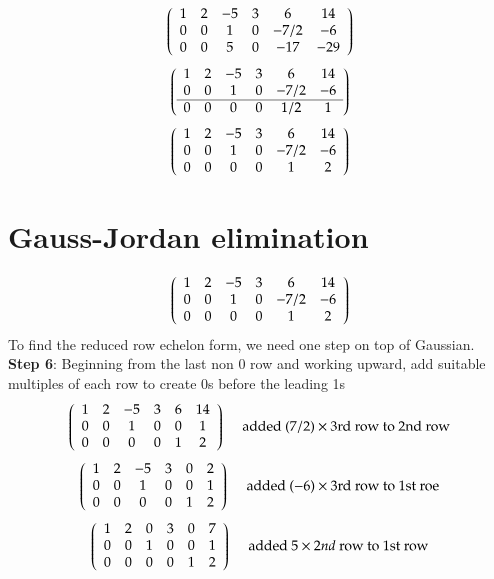 \documentclass{article}[18pt]
\begin{document}
$$\left( \begin{array} { c c c c c c } { 1 } & { 2 } & { - 5 } & { 3 } & { 6 } & { 14 } \\ { 0 } & { 0 } & { 1 } & { 0 } & { - 7 / 2 } & { - 6 } \\ { 0 } & { 0 } & { 5 } & { 0 } & { - 17 } & { - 29 } \end{array} \right)$$
$$\left( \begin{array} { c c c c c c } { 1 } & { 2 } & { - 5 } & { 3 } & { 6 } & { 14 } \\ { 0 } & { 0 } & { 1 } & { 0 } & { - 7 / 2 } & { - 6 } \\ \hline 0 & { 0 } & { 0 } & { 0 } & { 1 / 2 } & { 1 } \end{array} \right)$$
$$\left( \begin{array} { c c c c c c } { 1 } & { 2 } & { - 5 } & { 3 } & { 6 } & { 14 } \\ { 0 } & { 0 } & { 1 } & { 0 } & { - 7 / 2 } & { - 6 } \\ { 0 } & { 0 } & { 0 } & { 0 } & { 1 } & { 2 } \end{array} \right)$$
\section{Gauss-Jordan elimination}
$$\left( \begin{array} { c c c c c c } { 1 } & { 2 } & { - 5 } & { 3 } & { 6 } & { 14 } \\ { 0 } & { 0 } & { 1 } & { 0 } & { - 7 / 2 } & { - 6 } \\ { 0 } & { 0 } & { 0 } & { 0 } & { 1 } & { 2 } \end{array} \right)$$
To find the reduced row echelon form, we need one step on top of Gaussian.\\
\textbf{Step 6}: Beginning from the last non 0 row and working upward, add suitable multiples of each row to create 0s before the leading 1s
$$\left( \begin{array} { c c c c c c } { 1 } & { 2 } & { - 5 } & { 3 } & { 6 } & { 14 } \\ { 0 } & { 0 } & { 1 } & { 0 } & { 0 } & { 1 } \\ { 0 } & { 0 } & { 0 } & { 0 } & { 1 } & { 2 } \end{array} \right) \quad \text { added } ( 7 / 2 ) \times 3 \text {rd row to } 2 \text{nd row}$$
$$\left( \begin{array} { c c c c c c } { 1 } & { 2 } & { - 5 } & { 3 } & { 0 } & { 2 } \\ { 0 } & { 0 } & { 1 } & { 0 } & { 0 } & { 1 } \\ { 0 } & { 0 } & { 0 } & { 0 } & { 1 } & { 2 } \end{array} \right) \quad \text { added } ( - 6 ) \times 3 \text {rd row to } 1 \text{st roe}$$
$$\left( \begin{array} { l l l l l l } { 1 } & { 2 } & { 0 } & { 3 } & { 0 } & { 7 } \\ { 0 } & { 0 } & { 1 } & { 0 } & { 0 } & { 1 } \\ { 0 } & { 0 } & { 0 } & { 0 } & { 1 } & { 2 } \end{array} \right) \quad \text { added } 5 \times 2 n d \text { row to } 1 \text{st row}$$
\end{document}
